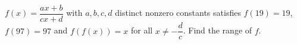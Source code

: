 $f(x)=\dfrac{ax+b}{cx+d}$ with $a,b,c,d$ distinct nonzero constants satisfies $f(19)=19$, $f(97)=97$ and $f(f(x))=x$ for all $x\ne-\dfrac dc$. Find the range of $f$.
